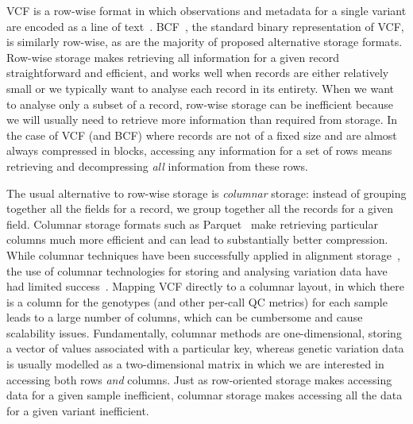 \documentclass[a4paper,num-refs]{oup-contemporary}
\begin{document}
VCF is a row-wise format in which 
observations and metadata for a single variant are
encoded as a line of text~\citep{danecek2011variant}.
BCF~\citep{li2011statistical}, the standard binary representation of VCF,
is similarly row-wise, as 
are the majority of proposed alternative storage 
formats.
Row-wise storage makes retrieving all information
for a given record straightforward and efficient,
and works well when records are either relatively small
or we typically want to analyse each record in its entirety.
When we want to analyse only a subset of a record,
row-wise storage can be inefficient because we will usually need to
retrieve more information than required from storage. In the case 
of VCF (and BCF) where records are not of a fixed size and 
are almost always compressed in blocks, accessing any information
for a set of rows means retrieving and decompressing \emph{all} 
information from these rows.

The usual alternative to row-wise storage is \emph{columnar} storage:
instead of grouping together all the fields for a record,
we group together all the records for a given field.
Columnar storage formats such as Parquet~\citep{parquet2024}
make retrieving particular columns much 
more efficient and can lead to substantially better compression.
While columnar techniques have been successfully applied 
in alignment
storage~\citep[e.g.][]{bonfield2014scramble,nothaft2015rethinking,bonfield2022cram},
the use of columnar technologies for
storing and analysing variation data have had limited
success~\citep{boufea2017managing,fan2020variant}.
Mapping VCF directly to a columnar layout, in which there is a 
column for the genotypes (and other per-call QC metrics) 
for each sample leads to a large number of columns, which 
can be cumbersome and cause scalability issues.
Fundamentally, columnar methods are one-dimensional, storing a vector
of values associated with a particular key, whereas 
genetic variation data is usually modelled as a two-dimensional matrix
in which we are interested in accessing both rows \emph{and} columns.
Just as row-oriented storage makes accessing data for a given
sample inefficient, columnar storage makes accessing all the data 
for a given variant inefficient.
\end{document}
